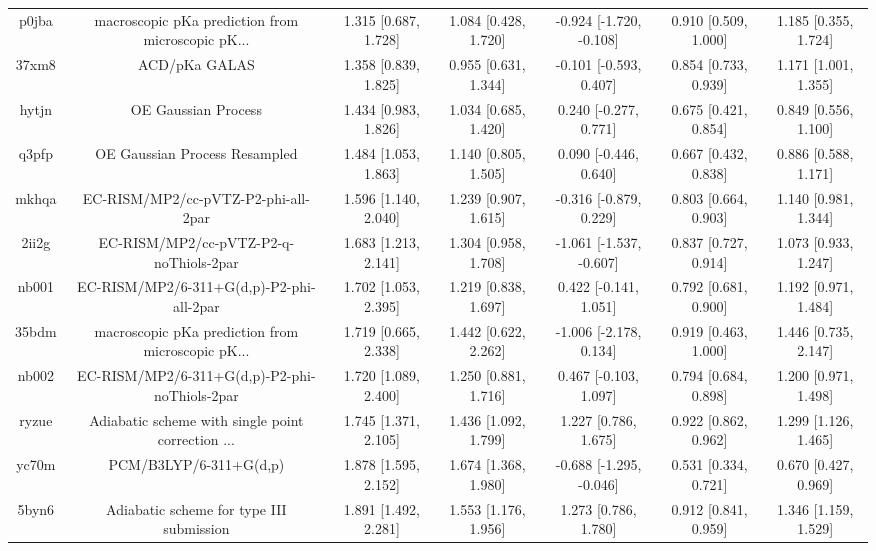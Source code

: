 \documentclass{article}
\begin{document}
\begin{center}
\begin{longtable}{|ccccccc|}
 p0jba &  macroscopic pKa prediction from microscopic pK... &  1.315 [0.687, 1.728] &  1.084 [0.428, 1.720] &  -0.924 [-1.720, -0.108] &  0.910 [0.509, 1.000] &   1.185 [0.355, 1.724] \\
 37xm8 &                                      ACD/pKa GALAS &  1.358 [0.839, 1.825] &  0.955 [0.631, 1.344] &   -0.101 [-0.593, 0.407] &  0.854 [0.733, 0.939] &   1.171 [1.001, 1.355] \\
 hytjn &                                OE Gaussian Process &  1.434 [0.983, 1.826] &  1.034 [0.685, 1.420] &    0.240 [-0.277, 0.771] &  0.675 [0.421, 0.854] &   0.849 [0.556, 1.100] \\
 q3pfp &                      OE Gaussian Process Resampled &  1.484 [1.053, 1.863] &  1.140 [0.805, 1.505] &    0.090 [-0.446, 0.640] &  0.667 [0.432, 0.838] &   0.886 [0.588, 1.171] \\
 mkhqa &                EC-RISM/MP2/cc-pVTZ-P2-phi-all-2par &  1.596 [1.140, 2.040] &  1.239 [0.907, 1.615] &   -0.316 [-0.879, 0.229] &  0.803 [0.664, 0.903] &   1.140 [0.981, 1.344] \\
 2ii2g &             EC-RISM/MP2/cc-pVTZ-P2-q-noThiols-2par &  1.683 [1.213, 2.141] &  1.304 [0.958, 1.708] &  -1.061 [-1.537, -0.607] &  0.837 [0.727, 0.914] &   1.073 [0.933, 1.247] \\
 nb001 &           EC-RISM/MP2/6-311+G(d,p)-P2-phi-all-2par &  1.702 [1.053, 2.395] &  1.219 [0.838, 1.697] &    0.422 [-0.141, 1.051] &  0.792 [0.681, 0.900] &   1.192 [0.971, 1.484] \\
 35bdm &  macroscopic pKa prediction from microscopic pK... &  1.719 [0.665, 2.338] &  1.442 [0.622, 2.262] &   -1.006 [-2.178, 0.134] &  0.919 [0.463, 1.000] &   1.446 [0.735, 2.147] \\
 nb002 &      EC-RISM/MP2/6-311+G(d,p)-P2-phi-noThiols-2par &  1.720 [1.089, 2.400] &  1.250 [0.881, 1.716] &    0.467 [-0.103, 1.097] &  0.794 [0.684, 0.898] &   1.200 [0.971, 1.498] \\
 ryzue &  Adiabatic scheme with single point correction ... &  1.745 [1.371, 2.105] &  1.436 [1.092, 1.799] &     1.227 [0.786, 1.675] &  0.922 [0.862, 0.962] &   1.299 [1.126, 1.465] \\
 yc70m &                             PCM/B3LYP/6-311+G(d,p) &  1.878 [1.595, 2.152] &  1.674 [1.368, 1.980] &  -0.688 [-1.295, -0.046] &  0.531 [0.334, 0.721] &   0.670 [0.427, 0.969] \\
 5byn6 &           Adiabatic scheme for type III submission &  1.891 [1.492, 2.281] &  1.553 [1.176, 1.956] &     1.273 [0.786, 1.780] &  0.912 [0.841, 0.959] &   1.346 [1.159, 1.529] \\

\end{longtable}
\end{center}
\end{document}
